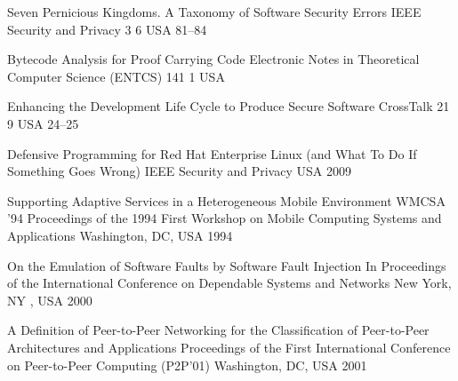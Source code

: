 \begin{thebibliography}{9}
		{
			\biband
			\biband
			}
		{Seven Pernicious Kingdoms. A Taxonomy of Software Security Errors}
		{{IEEE} Security and Privacy}
		{3}
		{6}
		{USA}
		{}
		{81--84}
	
		{
			\biband
			\biband
			}
		{Bytecode Analysis for Proof Carrying Code}
		{Electronic Notes in Theoretical Computer Science ({ENTCS})}
		{141}
		{1}
		{USA}
		{}
		{}
	
		{}
		{Enhancing the Development Life Cycle to Produce Secure Software}
		{CrossTalk}
		{21}
		{9}
		{USA}
		{}
		{24--25}
	
		{}
		{Defensive Programming for {R}ed {H}at {E}nterprise {L}inux (and What To Do If Something Goes Wrong)}
		{{IEEE} Security and Privacy}
		{}
		{}
		{USA}
		{2009}
		{}
		

		{
			\biband
			\biband
			\biband
			}
		{Supporting Adaptive Services in a Heterogeneous Mobile Environment}
		{WMCSA '94 Proceedings of the 1994 First Workshop on Mobile Computing Systems and Applications}
		{Washington, DC, USA}
		{1994}
		
		{
			\biband
			\biband
			}
		{On the Emulation of Software Faults by Software Fault Injection}
		{In Proceedings of the International Conference on Dependable Systems and Networks}
		{New York, NY , USA}
		{2000}
	
		{}
		{A Definition of Peer-to-Peer Networking for the Classification of Peer-to-Peer Architectures and Applications}
		{Proceedings of the First International Conference on Peer-to-Peer Computing ({P2P}'01)}
		{Washington, DC, USA}
		{2001}


\end{thebibliography}
